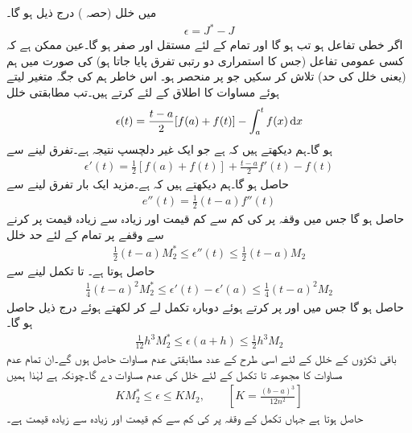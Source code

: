  میں خلل (حصہ )  درج ذیل ہو گا۔
\begin{align*}
\epsilon=J^*-J
\end{align*}
اگر  خطی تفاعل ہو تب  ہو گا اور تمام  کے لئے   مستقل اور  صفر ہو گا۔عین ممکن ہے کہ کسی عمومی تفاعل  (جس کا استمراری دو رتبی تفرق پایا جاتا ہو)  کی صورت میں ہم   (یعنی خلل  کی حد) تلاش کر سکیں جو  پر منحصر ہو۔ اس خاطر ہم  کی جگہ متغیر  لیتے ہوئے  مساوات  کا اطلاق  کے لئے کرتے ہیں۔تب مطابقتی خلل
\begin{align*}
\epsilon(t)=\frac{t-a}{2}[f(a)+f(t)]-\int_a^t f(x)\dif x
\end{align*}
ہو گا۔ہم دیکھتے ہیں کہ  ہے جو ایک غیر دلچسپ نتیجہ ہے۔تفرق لینے سے
\begin{align*}
\epsilon'(t)=\frac{1}{2}[f(a)+f(t)]+\frac{t-a}{2}f'(t)-f(t)
\end{align*}
حاصل ہو گا۔ہم دیکھتے ہیں کہ  ہے۔مزید ایک بار تفرق لینے سے
\begin{align*}
e''(t)=\frac{1}{2}(t-a)f''(t)
\end{align*}
حاصل ہو گا جس میں وقفہ  پر  کی کم سے کم قیمت   اور زیادہ سے زیادہ قیمت   پر کرنے سے وقفے پر تمام  کے لئے  حد خلل
\begin{align*}
\frac{1}{2}(t-a)M_2^*\le \epsilon''(t)\le \frac{1}{2}(t-a)M_2
\end{align*}
حاصل ہوتا ہے۔ تا  تکمل لینے سے
\begin{align*}
\frac{1}{4}(t-a)^2M_2^*\le \epsilon'(t)-\epsilon'(a)\le \frac{1}{4}(t-a)^2M_2
\end{align*}
حاصل ہو گا جس میں  اور  پر کرتے ہوئے دوبارہ تکمل لے کر  لکھتے ہوئے درج ذیل حاصل ہو گا۔
\begin{align*}
\frac{1}{12}h^3M_2^*\le \epsilon(a+h)\le \frac{1}{2}h^3M_2
\end{align*}
باقی  ٹکڑوں کے خلل کے لئے اسی طرح کے  عدد مطابقتی عدم مساوات  حاصل ہوں گے۔ان تمام  عدم مساوات کا مجموعہ  تا  تکمل کے لئے خلل  کی عدم مساوات دے گا۔چونکہ  ہے لہٰذا ہمیں
\begin{align}\label{مساوات_اعدادی_حد_خلل}
KM_2^*\le \epsilon\le KM_2,\quad \quad [K=\tfrac{(b-a)^3}{12n^2}]
\end{align}
حاصل ہوتا ہے جہاں تکمل کے  وقفہ پر  کی کم سے کم قیمت  اور زیادہ سے زیادہ قیمت  ہے۔

